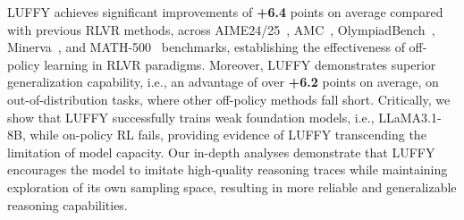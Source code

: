 \documentclass{article}
\begin{document}





LUFFY achieves significant improvements of \textbf{+6.4} points on average compared with previous RLVR methods, across AIME24/25~\cite{li2024numinamath}, AMC~\cite{li2024numinamath}, OlympiadBench~\cite{dataset_olympiad}, Minerva~\cite{dataset_minerva}, and MATH-500~\cite{dataset_math} benchmarks, establishing the effectiveness of off-policy learning in RLVR paradigms. 
Moreover, LUFFY demonstrates superior generalization capability, i.e., an advantage of over \textbf{+6.2} points on average, on out-of-distribution tasks, where other off-policy methods fall short.
Critically, we show that LUFFY successfully trains weak foundation models, i.e., LLaMA3.1-8B, while on-policy RL fails, providing evidence of LUFFY transcending the limitation of model capacity. 
Our in-depth analyses demonstrate that LUFFY encourages the model to imitate high-quality reasoning traces while maintaining exploration of its own sampling space, resulting in more reliable and generalizable reasoning capabilities.
\end{document}
